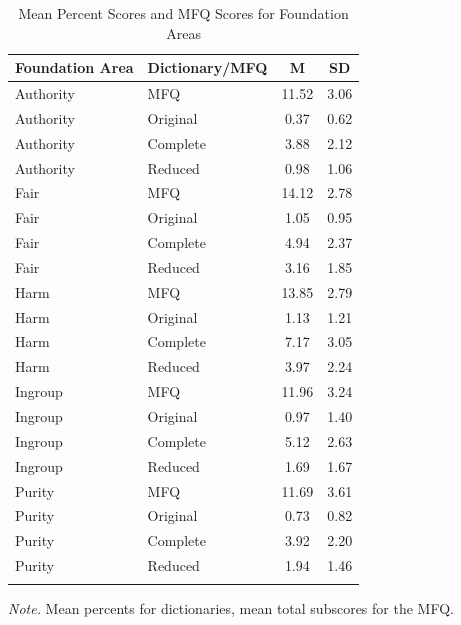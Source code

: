 \documentclass[
  man,floatsintext]{apa6}
\begin{document}
\begin{table}[ht]

\begin{center}
\begin{threeparttable}

\caption{\label{tab:tab-mtmm}Mean Percent Scores and MFQ Scores for Foundation Areas}

\footnotesize{

\begin{tabular}{llcc}
\toprule
Foundation Area & Dictionary/MFQ & M & SD\\
\midrule
Authority & MFQ & 11.52 & 3.06\\
Authority & Original & 0.37 & 0.62\\
Authority & Complete & 3.88 & 2.12\\
Authority & Reduced & 0.98 & 1.06\\
Fair & MFQ & 14.12 & 2.78\\
Fair & Original & 1.05 & 0.95\\
Fair & Complete & 4.94 & 2.37\\
Fair & Reduced & 3.16 & 1.85\\
Harm & MFQ & 13.85 & 2.79\\
Harm & Original & 1.13 & 1.21\\
Harm & Complete & 7.17 & 3.05\\
Harm & Reduced & 3.97 & 2.24\\
Ingroup & MFQ & 11.96 & 3.24\\
Ingroup & Original & 0.97 & 1.40\\
Ingroup & Complete & 5.12 & 2.63\\
Ingroup & Reduced & 1.69 & 1.67\\
Purity & MFQ & 11.69 & 3.61\\
Purity & Original & 0.73 & 0.82\\
Purity & Complete & 3.92 & 2.20\\
Purity & Reduced & 1.94 & 1.46\\
\bottomrule
\addlinespace
\end{tabular}

}

\begin{tablenotes}[para]
\normalsize{\textit{Note.} Mean percents for dictionaries, mean total subscores for the MFQ.}
\end{tablenotes}

\end{threeparttable}
\end{center}

\end{table}
\end{document}
